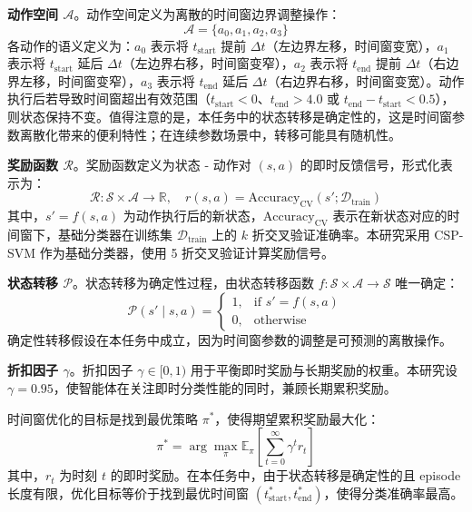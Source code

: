 \textbf{动作空间 $\mathcal{A}$}。动作空间定义为离散的时间窗边界调整操作：
\begin{equation}
\mathcal{A} = \{a_0, a_1, a_2, a_3\}
\end{equation}
各动作的语义定义为：$a_0$ 表示将 $t_{\text{start}}$ 提前 $\Delta t$（左边界左移，时间窗变宽），$a_1$ 表示将 $t_{\text{start}}$ 延后 $\Delta t$（左边界右移，时间窗变窄），$a_2$ 表示将 $t_{\text{end}}$ 提前 $\Delta t$（右边界左移，时间窗变窄），$a_3$ 表示将 $t_{\text{end}}$ 延后 $\Delta t$（右边界右移，时间窗变宽）。动作执行后若导致时间窗超出有效范围（$t_{\text{start}} < 0$、$t_{\text{end}} > 4.0$ 或 $t_{\text{end}} - t_{\text{start}} < 0.5$），则状态保持不变。值得注意的是，本任务中的状态转移是确定性的，这是时间窗参数离散化带来的便利特性；在连续参数场景中，转移可能具有随机性。

\textbf{奖励函数 $\mathcal{R}$}。奖励函数定义为状态 - 动作对 $(s, a)$ 的即时反馈信号，形式化表示为：
\begin{equation}
\mathcal{R}: \mathcal{S} \times \mathcal{A} \rightarrow \mathbb{R}, \quad r(s, a) = \text{Accuracy}_{\text{CV}}(s'; \mathcal{D}_{\text{train}})
\end{equation}
其中，$s' = f(s, a)$ 为动作执行后的新状态，$\text{Accuracy}_{\text{CV}}$ 表示在新状态对应的时间窗下，基础分类器在训练集 $\mathcal{D}_{\text{train}}$ 上的 $k$ 折交叉验证准确率。本研究采用 CSP-SVM 作为基础分类器\cite{blankertz2008optimizing}，使用 5 折交叉验证计算奖励信号。

\textbf{状态转移 $\mathcal{P}$}。状态转移为确定性过程，由状态转移函数 $f: \mathcal{S} \times \mathcal{A} \rightarrow \mathcal{S}$ 唯一确定：
\begin{equation}
\mathcal{P}(s' \mid s, a) =
\begin{cases}
1, & \text{if } s' = f(s, a) \\
0, & \text{otherwise}
\end{cases}
\end{equation}
确定性转移假设在本任务中成立，因为时间窗参数的调整是可预测的离散操作。

\textbf{折扣因子 $\gamma$}。折扣因子 $\gamma \in [0, 1)$ 用于平衡即时奖励与长期奖励的权重。本研究设 $\gamma = 0.95$，使智能体在关注即时分类性能的同时，兼顾长期累积奖励。

\label{subsec:objective}

时间窗优化的目标是找到最优策略 $\pi^*$，使得期望累积奖励最大化：
\begin{equation}
\pi^* = \arg\max_{\pi} \mathbb{E}_{\pi} \left[ \sum_{t=0}^{\infty} \gamma^t r_t \right]
\end{equation}
其中，$r_t$ 为时刻 $t$ 的即时奖励。在本任务中，由于状态转移是确定性的且 episode 长度有限，优化目标等价于找到最优时间窗 $(t_{\text{start}}^*, t_{\text{end}}^*)$，使得分类准确率最高。

